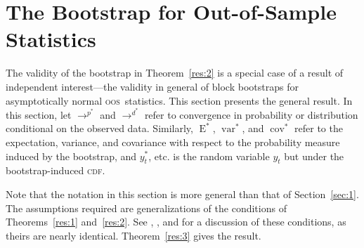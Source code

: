 \documentclass[12pt,fleqn]{article}
\theoremstyle{definition}
\DeclareMathOperator{\E}{E}
\DeclareMathOperator{\var}{var}
\DeclareMathOperator{\cov}{cov}
\newcommand{\cdf}{\textsc{cdf}}
\newcommand{\oos}{\textsc{oos}}
\begin{document}
\section{The Bootstrap for Out-of-Sample Statistics}\label{sec:1b}
The validity of the bootstrap in Theorem~\ref{res:2} is a special case
of a result of independent interest---the validity in general of block
bootstraps for asymptotically normal \oos\ statistics.  This section
presents the general result.  In this section, let $\to^{p^{*}}$ and
$\to^{d^{*}}$ refer to convergence in probability or distribution
conditional on the observed data.  Similarly, $\E^{*}$, $\var^{*}$,
and $\cov^{*}$ refer to the expectation, variance, and covariance with
respect to the probability measure induced by the bootstrap, and
$y_t^{*}$, etc. is the random variable $y_t$ but under the
bootstrap-induced \cdf.

Note that the notation in this section is more general than that of
Section~\ref{sec:1}.  The assumptions required are generalizations of
the conditions of Theorems~\ref{res:1} and~\ref{res:2}.  See
\citet{Wes:96,Wes:06}, \citet{WeM:98}, and \citet{Mcc:00} for a
discussion of these conditions, as theirs are nearly identical.
Theorem~\ref{res:3} gives the result.
\end{document}
